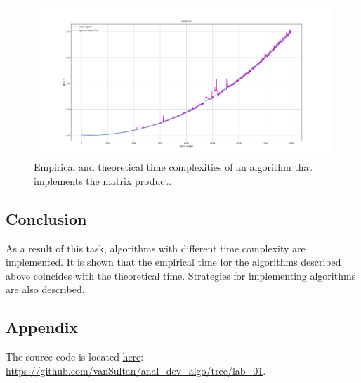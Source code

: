 \begin{figure}[H]
    \center
    \includegraphics[width=\textwidth]{img/matmul.png}
    \caption{Empirical and theoretical time complexities of an algorithm that implements the matrix product.}
    \label{ris:matmul}
\end{figure}

\subsection{Conclusion}

As a result of this task, algorithms with different time complexity are implemented.
It is shown that the empirical time for the algorithms described above coincides with the theoretical time.
Strategies for implementing algorithms are also described.

\subsection{Appendix}

The source code is located \href{https://github.com/vanSultan/anal_dev_algo/tree/lab_01}{here}: \url{https://github.com/vanSultan/anal_dev_algo/tree/lab_01}.
